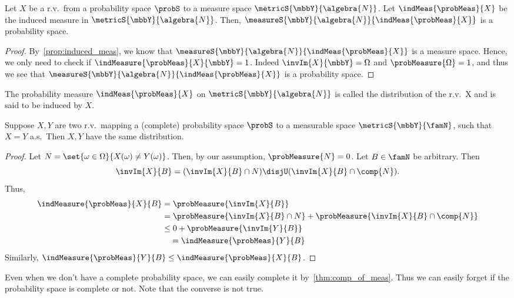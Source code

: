 \begin{Proposition}
    Let $X$ be a r.v.~from a probability space $\probS$ to a measure space $\metricS{\mbbY}{\algebra{N}}$.
    Let $\indMeas{\probMeas}{X}$ be the induced measure in $\metricS{\mbbY}{\algebra{N}}$. Then, 
    $\measureS{\mbbY}{\algebra{N}}{\indMeas{\probMeas}{X}}$ is a probability space.  
\end{Proposition}
\begin{proof}
    By~\ref{prop:induced_meas}, we know that $\measureS{\mbbY}{\algebra{N}}{\indMeas{\probMeas}{X}}$ is a
    measure space. Hence, we only need to check if $\indMeasure{\probMeas}{X}{\mbbY} = 1$. Indeed
    $\invIm{X}{\mbbY} = \Omega$ and $\probMeasure{\Omega} =1$, and thus we see that
    $\measureS{\mbbY}{\algebra{N}}{\indMeas{\probMeas}{X}}$ is a probability space.
\end{proof}
\begin{Definition}[name=Distribution]
    The probability measure $\indMeas{\probMeas}{X}$ on $\metricS{\mbbY}{\algebra{N}}$ is called the
    distribution of the r.v.~X and is said to be induced by $X$. 
\end{Definition}
\begin{Theorem}\label{thm:rv_equal_ae_distribution}
    Suppose $X,Y$ are two r.v.~mapping a (complete) probability space $\probS$ to a measurable space
    $\metricS{\mbbY}{\famN}$, 
    such that $X=Y$ a.s.~Then $X,Y$ have the same distribution.
\end{Theorem}
\begin{proof}
    Let $N = \set{\omega\in\Omega}{X(\omega) \neq Y(\omega)}$. Then, by our assumption, $\probMeasure{N} = 0$.
    Let $B \in \famN$ be arbitrary. Then \[\invIm{X}{B} = (\invIm{X}{B}\cap N) \disjU
    (\invIm{X}{B}\cap\comp{N}).\]
    Thus,
    \begin{align*}
	\indMeasure{\probMeas}{X}{B} &= \probMeasure{\invIm{X}{B}} \\  
	& = \probMeasure{\invIm{X}{B}\cap N} + \probMeasure{\invIm{X}{B}\cap\comp{N}} \\
	& \leq 0 + \probMeasure{\invIm{Y}{B}}\\
	&\quad = \indMeasure{\probMeas}{Y}{B}
    \end{align*}
    Similarly, $\indMeasure{\probMeas}{Y}{B} \leq \indMeasure{\probMeas}{X}{B}$.
\end{proof}
Even when we don't have a complete probability space, we can easily complete it by~\ref{thm:comp_of_meas}.
Thus we can easily forget if the probability space is complete or not. Note that the converse is not true.
